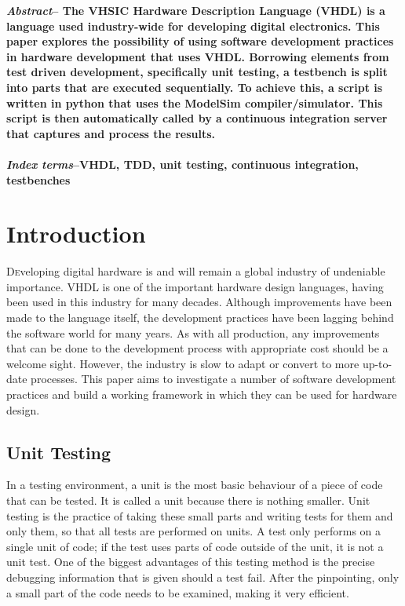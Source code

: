 \documentclass[twoside]{article}
\begin{document}
\begin{multicols}{2} %

\textbf{\emph{Abstract}-- The VHSIC Hardware Description Language (VHDL) is a language used industry-wide for developing digital electronics. This paper explores the possibility of using software development practices in hardware development that uses VHDL. Borrowing elements from test driven development, specifically unit testing, a testbench is split into parts that are executed sequentially. To achieve this, a script is written in python that uses the ModelSim compiler/simulator. This script is then automatically called by a continuous integration server that captures and process the results.
\\
\\
\emph{Index terms}--VHDL, TDD, unit testing, continuous integration, testbenches}


\section{Introduction}
\lettrine[nindent=0em,lines=3]{D} eveloping digital hardware is and will remain a global industry of undeniable importance. VHDL is one of the important hardware design languages, having been used in this industry for many decades. Although improvements have been made to the language itself, the development practices have been lagging behind the software world for many years. As with all production, any improvements that can be done to the development process with appropriate cost should be a welcome sight. However, the industry is slow to adapt or convert to more up-to-date processes. This paper aims to investigate a number of software development practices and build a working framework in which they can be used for hardware design.\cite{vhdlorigin,vhdlsim,vhdlsynth}
%
%


\subsection{Unit Testing}
In a testing environment, a unit is the most basic behaviour of a piece of code that can be tested. It is called a unit because there is nothing smaller. Unit testing is the practice of taking these small parts and writing tests for them and only them, so that all tests are performed on units. A test only performs on a single unit of code; if the test uses parts of code outside of the unit, it is not a unit test. One of the biggest advantages of this testing method is the precise debugging information that is given should a test fail. After the pinpointing, only a small part of the code needs to be examined, making it very efficient.\cite{extremeunit,VHDLUnit}


\end{multicols}
\end{document}
